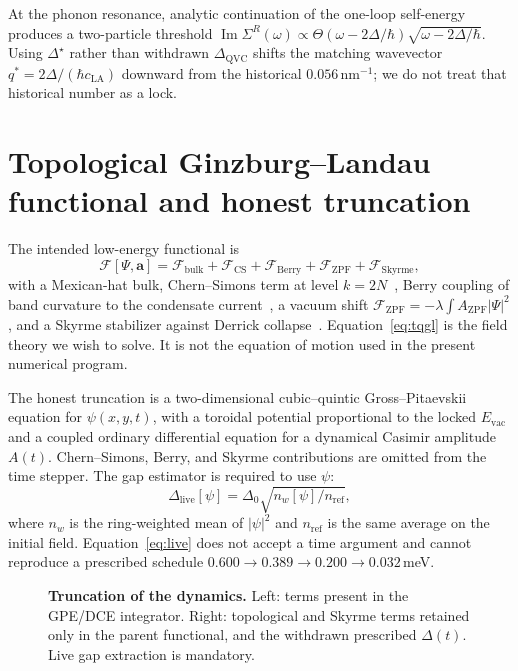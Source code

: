 \documentclass[11pt,letterpaper]{article}
\begin{document}
At the phonon resonance, analytic continuation of the one-loop self-energy produces a two-particle threshold $\operatorname{Im}\Sigma^R(\omega)\propto\Theta(\omega-2\Delta/\hbar)\sqrt{\omega-2\Delta/\hbar}$. Using $\Delta^\star$ rather than withdrawn $\Delta_{\mathrm{QVC}}$ shifts the matching wavevector $q^*=2\Delta/(\hbar c_{\mathrm{LA}})$ downward from the historical $0.056$\,nm$^{-1}$; we do not treat that historical number as a lock.

\section{Topological Ginzburg--Landau functional and honest truncation}
\label{sec:tqgl}

The intended low-energy functional is
\begin{equation}
\mathcal{F}[\Psi,\mathbf{a}]=\mathcal{F}_{\mathrm{bulk}}+\mathcal{F}_{\mathrm{CS}}+\mathcal{F}_{\mathrm{Berry}}+\mathcal{F}_{\mathrm{ZPF}}+\mathcal{F}_{\mathrm{Skyrme}},
\label{eq:tqgl}
\end{equation}
with a Mexican-hat bulk, Chern--Simons term at level $k=2N$~\cite{Laughlin1983,Wen1995}, Berry coupling of band curvature to the condensate current~\cite{Xiao2010,Qi2011}, a vacuum shift $\mathcal{F}_{\mathrm{ZPF}}=-\lambda\int A_{\mathrm{ZPF}}|\Psi|^2$, and a Skyrme stabilizer against Derrick collapse~\cite{Faddeev1997,Sutcliffe2007}. Equation~\eqref{eq:tqgl} is the field theory we wish to solve. It is not the equation of motion used in the present numerical program.

The honest truncation is a two-dimensional cubic--quintic Gross--Pitaevskii equation for $\psi(x,y,t)$, with a toroidal potential proportional to the locked $E_{\mathrm{vac}}$ and a coupled ordinary differential equation for a dynamical Casimir amplitude $A(t)$. Chern--Simons, Berry, and Skyrme contributions are omitted from the time stepper. The gap estimator is required to use $\psi$:
\begin{equation}
\Delta_{\mathrm{live}}[\psi]=\Delta_0\sqrt{n_w[\psi]/n_{\mathrm{ref}}},
\label{eq:live}
\end{equation}
where $n_w$ is the ring-weighted mean of $|\psi|^2$ and $n_{\mathrm{ref}}$ is the same average on the initial field. Equation~\eqref{eq:live} does not accept a time argument and cannot reproduce a prescribed schedule $0.600\to 0.389\to 0.200\to 0.032$\,meV.

\begin{figure}[H]
\centering

\caption{\textbf{Truncation of the dynamics.} Left: terms present in the GPE/DCE integrator. Right: topological and Skyrme terms retained only in the parent functional, and the withdrawn prescribed $\Delta(t)$. Live gap extraction is mandatory.}
\label{fig:trunc}
\end{figure}
\end{document}
